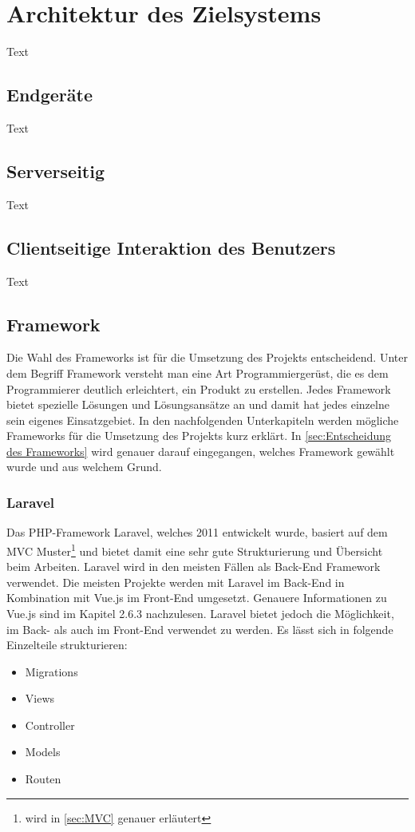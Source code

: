 \section{Architektur des Zielsystems}
Text

\subsection{Endgeräte}
Text

\subsection{Serverseitig}
Text

\subsection{Clientseitige Interaktion des Benutzers}
Text

\subsection{Framework}
Die Wahl des Frameworks ist für die Umsetzung des Projekts entscheidend. Unter dem Begriff Framework versteht man eine Art Programmiergerüst, die es dem Programmierer deutlich erleichtert, ein Produkt zu erstellen. Jedes Framework bietet spezielle Lösungen und Lösungsansätze an und damit hat jedes einzelne sein eigenes Einsatzgebiet. In den nachfolgenden Unterkapiteln werden mögliche Frameworks für die Umsetzung des Projekts kurz erklärt. In \ref{sec:Entscheidung des Frameworks} wird genauer darauf eingegangen, welches Framework gewählt wurde und aus welchem Grund.

\subsubsection{Laravel}
Das PHP-Framework Laravel, welches 2011 entwickelt wurde, basiert auf dem MVC Muster\footnote{wird in  \autoref{sec:MVC} genauer erläutert} und bietet damit eine sehr gute Strukturierung und Übersicht beim Arbeiten. Laravel wird in den meisten Fällen als Back-End Framework verwendet. Die meisten Projekte werden mit Laravel im Back-End in Kombination mit Vue.js im Front-End umgesetzt. Genauere Informationen  zu Vue.js sind im Kapitel 2.6.3 nachzulesen. Laravel bietet jedoch die Möglichkeit, im Back- als auch im Front-End verwendet zu werden. Es lässt sich in folgende Einzelteile strukturieren:

\begin{itemize}
	\item Migrations 
	\item Views
	\item Controller 
	\item Models
	\item Routen 
\end{itemize}

